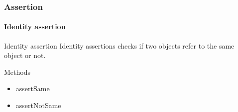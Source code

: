 \begin{frame}[parent={concept:assertion}, hasprev=false, hasnext=false]
\frametitle{Assertion}
\framesubtitle{Identity assertion}
\label{concept:junit-identity-assertion}
\label{concept:identity-assertion}

\begin{block:concept}{Identity assertion}
Identity assertions checks if two objects refer to the same object or not.
\end{block:concept}

\begin{block:fact}{Methods}
\begin{itemize}
	\item assertSame
	\item assertNotSame
\end{itemize}
\end{block:fact}

\hfill
{}
\end{frame}
